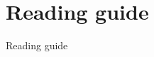 \documentclass[../main.tex]{subfiles}
\begin{document}
\section*{Reading guide}
Reading guide
\end{document}
